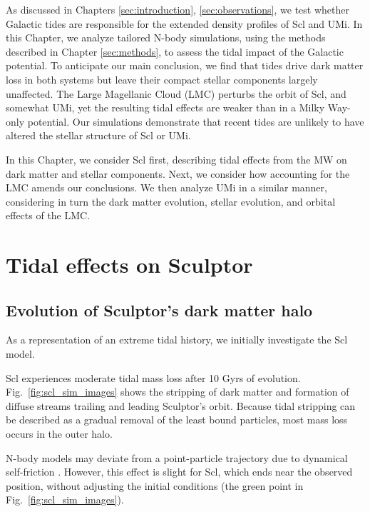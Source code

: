 As discussed in Chapters \ref{sec:introduction}, \ref{sec:observations},
we test whether Galactic tides are responsible for the extended density
profiles of Scl and UMi. In this Chapter, we analyze tailored N-body
simulations, using the methods described in Chapter \ref{sec:methods},
to assess the tidal impact of the Galactic potential. To anticipate our
main conclusion, we find that tides drive dark matter loss in both
systems but leave their compact stellar components largely unaffected.
The Large Magellanic Cloud (LMC) perturbs the orbit of Scl, and somewhat
UMi, yet the resulting tidal effects are weaker than in a Milky Way-only
potential. Our simulations demonstrate that recent tides are unlikely to
have altered the stellar structure of Scl or UMi.

In this Chapter, we consider Scl first, describing tidal effects from
the MW on dark matter and stellar components. Next, we consider how
accounting for the LMC amends our conclusions. We then analyze UMi in a
similar manner, considering in turn the dark matter evolution, stellar
evolution, and orbital effects of the LMC.

\section{Tidal effects on Sculptor}\label{tidal-effects-on-sculptor}

\subsection{Evolution of Sculptor's dark matter
halo}\label{evolution-of-sculptors-dark-matter-halo}

As a representation of an extreme tidal history, we initially
investigate the \smallperi{} Scl model.

Scl experiences moderate tidal mass loss after 10 Gyrs of evolution.
Fig.~\ref{fig:scl_sim_images} shows the stripping of dark matter and
formation of diffuse streams trailing and leading Sculptor's orbit.
Because tidal stripping can be described as a gradual removal of the
least bound particles, most mass loss occurs in the outer halo.

N-body models may deviate from a point-particle trajectory due to
dynamical self-friction \citep[e.g.,][]{white1983, miller+2020}.
However, this effect is slight for Scl, which ends near the observed
position, without adjusting the initial conditions (the green point in
Fig.~\ref{fig:scl_sim_images}).

